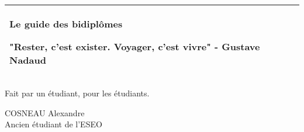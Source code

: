 %
\begin{titlepage}
  \addtolength{\hoffset}{0.5\evensidemargin-0.5\oddsidemargin} %
  \noindent%
  \begin{tabular}{@{}p{\textwidth}@{}}
    \toprule[2pt]
    \midrule
    \vspace{0.2cm}
    \begin{center}
    \Huge{\textbf{
      Le guide des bidiplômes
    }}
    \end{center}
    \begin{center}
      \Large{
        "Rester, c’est exister. Voyager, c’est vivre" - Gustave Nadaud
      }
    \end{center}
    \vspace{0.2cm}\\
    \midrule
    \toprule[2pt]
  \end{tabular}
  \vspace{4 cm}
  \begin{center}
    \vspace{0.2cm}
    {\Large
      Fait par un étudiant, pour les étudiants.
    }
  \end{center}
  \vfill
  \begin{center}
    COSNEAU Alexandre \\
    Ancien étudiant de l'ESEO
  \end{center}
\end{titlepage}
\clearpage

